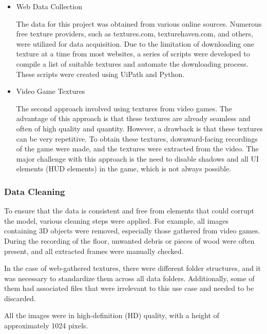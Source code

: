 \begin{itemize}
    \item Web Data Collection

    The data for this project was obtained from various online sources. Numerous free texture providers, such as textures.com, texturehaven.com, and others, were utilized for data acquisition. Due to the limitation of downloading one texture at a time from most websites, a series of scripts were developed to compile a list of suitable textures and automate the downloading process. These scripts were created using UiPath and Python.
    
    \item Video Game Textures
    
    The second approach involved using textures from video games. The advantage of this approach is that these textures are already seamless and often of high quality and quantity. However, a drawback is that these textures can be very repetitive. To obtain these textures, downward-facing recordings of the game were made, and the textures were extracted from the video. The major challenge with this approach is the need to disable shadows and all UI elements (HUD elements) in the game, which is not always possible.
\end{itemize}

\subsubsection{Data Cleaning}

    To ensure that the data is consistent and free from elements that could corrupt the model, various cleaning steps were applied. For example, all images containing 3D objects were removed, especially those gathered from video games. During the recording of the floor, unwanted debris or pieces of wood were often present, and all extracted frames were manually checked.

    In the case of web-gathered textures, there were different folder structures, and it was necessary to standardize them across all data folders. Additionally, some of them had associated files that were irrelevant to this use case and needed to be discarded.

    All the images were in high-definition (HD) quality, with a height of approximately 1024 pixels.


